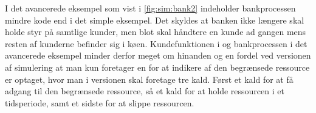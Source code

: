 I det avancerede eksempel som vist i  \cref{fig:sim:bank2} indeholder bankprocessen mindre kode end i det simple eksempel. Det skyldes at banken ikke længere skal holde styr på samtlige kunder, men blot skal håndtere en kunde ad gangen mens resten af kunderne befinder sig i køen. Kundefunktionen i \simpy og bankprocessen i det avancerede eksempel minder derfor meget om hinanden og en fordel ved \csp versionen af simulering at man kun foretager en  for at indikere af den begrænsede ressource er optaget, hvor man i \simpy versionen skal foretage tre kald. Først et kald for at få adgang til den begrænsede ressource, så et kald for at holde ressourcen i et tidsperiode, samt et sidste for at slippe ressourcen.

  
